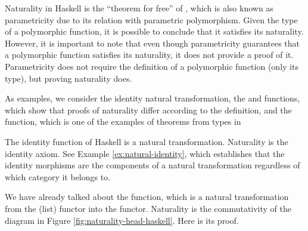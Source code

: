 Naturality in Haskell is the ``theorem for free'' of
\parencite{wadler-1989}, which is also known as parametricity due to
its relation with parametric polymorphism. Given the type of a
polymorphic function, it is possible to conclude that it satisfies its
naturality. However, it is important to note that even though
parametricity guarantees that a polymorphic function satisfies its
naturality, it does not provide a proof of it. Parametricity does not
require the definition of a polymorphic function (only its type), but
proving naturality does.

As examples, we consider the identity natural transformation, the
 and  functions, which show that
proofs of naturality differ according to the definition, and the
 function, which is one of the examples of
theorems from types in \parencite[349]{wadler-1989}

\begin{example}
  \label{ex:natural-identity-haskell}

  The identity function of Haskell is a natural transformation.
  Naturality is the identity axiom. See Example
  \ref{ex:natural-identity}, which establishes that the identity
  morphisms are the components of a natural transformation regardless
  of which category it belongs to.

\end{example}

\begin{example}
  \label{ex:natural-head-haskell}

  We have already talked about the  function, which
  is a natural transformation from the \texthaskell{[]} (list) functor
  into the  functor. Naturality is the
  commutativity of the diagram in Figure
  \ref{fig:naturality-head-haskell}. Here is its proof.

  \vspace{1em}
  \case{\texthaskell{[]}}
  \begin{steps}
  \end{steps}
  \begin{steps}
  \end{steps}

\end{example}

